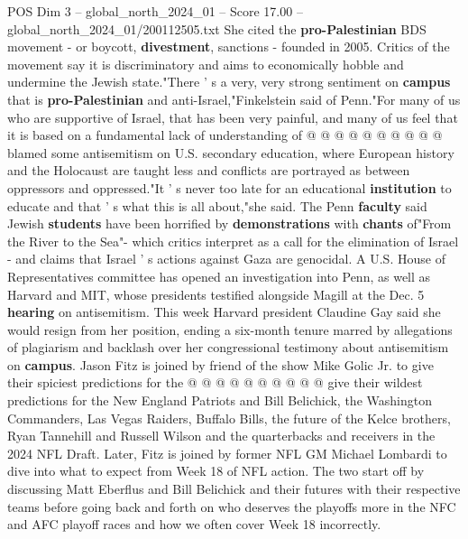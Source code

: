 \begin{textsample}{POS Dim 3 – global\_north\_2024\_01 – Score 17.00 – global\_north\_2024\_01/200112505.txt}
She cited the \textbf{pro-Palestinian} BDS movement - or boycott, \textbf{divestment}, sanctions - founded in 2005.
Critics of the movement say it is discriminatory and aims to economically hobble and undermine the Jewish state."There ' s a very, very strong sentiment on \textbf{campus} that is \textbf{pro-Palestinian} and anti-Israel,"Finkelstein said of Penn."For many of us who are supportive of Israel, that has been very painful, and many of us feel that it is based on a fundamental lack of understanding of @ @ @ @ @ @ @ @ @ @ blamed some antisemitism on U.S. secondary education, where European history and the Holocaust are taught less and conflicts are portrayed as between oppressors and oppressed."It ' s never too late for an educational \textbf{institution} to educate and that ' s what this is all about,"she said.
The Penn \textbf{faculty} said Jewish \textbf{students} have been horrified by \textbf{demonstrations} with \textbf{chants} of"From the River to the Sea"- which critics interpret as a call for the elimination of Israel - and claims that Israel ' s actions against Gaza are genocidal.
A U.S.
House of Representatives committee has opened an investigation into Penn, as well as Harvard and MIT, whose presidents testified alongside Magill at the Dec. 5 \textbf{hearing} on antisemitism.
This week Harvard president Claudine Gay said she would resign from her position, ending a six-month tenure marred by allegations of plagiarism and backlash over her congressional testimony about antisemitism on \textbf{campus}.
Jason Fitz is joined by friend of the show Mike Golic Jr. to give their spiciest predictions for the @ @ @ @ @ @ @ @ @ @ give their wildest predictions for the New England Patriots and Bill Belichick, the Washington Commanders, Las Vegas Raiders, Buffalo Bills, the future of the Kelce brothers, Ryan Tannehill and Russell Wilson and the quarterbacks and receivers in the 2024 NFL Draft.
Later, Fitz is joined by former NFL GM Michael Lombardi to dive into what to expect from Week 18 of NFL action.
The two start off by discussing Matt Eberflus and Bill Belichick and their futures with their respective teams before going back and forth on who deserves the playoffs more in the NFC and AFC playoff races and how we often cover Week 18 incorrectly.

\end{textsample}
